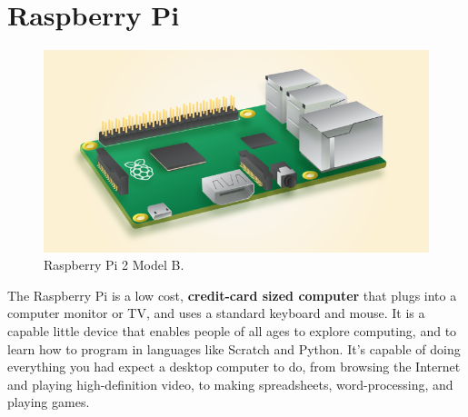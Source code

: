 \documentclass[a4paper,12pt]{report}
\begin{document}
\pagebreak




\section{Raspberry Pi}

 \begin{figure}[h]
 \centering
  \includegraphics[width=\textwidth]{figures/Pi_2_Model_B.png}
  \caption{Raspberry Pi 2 Model B.}
 \end{figure}

The Raspberry Pi is a low cost, \textbf{credit-card sized computer} that plugs into a computer monitor or TV, and uses 
a standard keyboard and mouse. It is a capable little device that enables people of all ages to explore computing, and 
to learn how to program in languages like Scratch and Python. It’s capable of doing everything you had expect a desktop 
computer to do, from browsing the Internet and playing high-definition video, to making spreadsheets, word-processing, 
and playing games.\cite{instructables_rpi}
\newline
\end{document}
